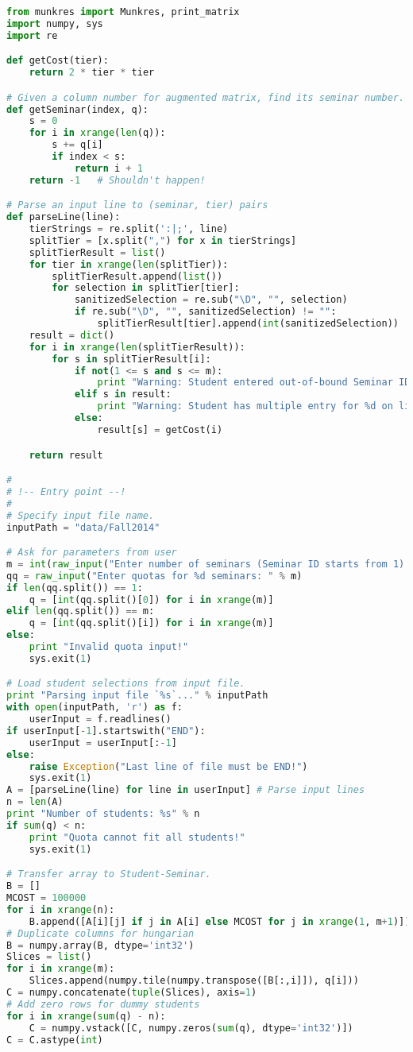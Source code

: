 \documentclass{article} %
\begin{document}
\begin{lstlisting}[language=python]
from munkres import Munkres, print_matrix
import numpy, sys
import re

def getCost(tier):
    return 2 * tier * tier

# Given a column number for augmented matrix, find its seminar number.
def getSeminar(index, q):
    s = 0
    for i in xrange(len(q)):
        s += q[i]
        if index < s:
            return i + 1
    return -1   # Shouldn't happen!

# Parse an input line to (seminar, tier) pairs
def parseLine(line):
    tierStrings = re.split(':|;', line)
    splitTier = [x.split(",") for x in tierStrings]
    splitTierResult = list()
    for tier in xrange(len(splitTier)):
        splitTierResult.append(list())
        for selection in splitTier[tier]:
            sanitizedSelection = re.sub("\D", "", selection)
            if re.sub("\D", "", sanitizedSelection) != "":
                splitTierResult[tier].append(int(sanitizedSelection))
    result = dict()
    for i in xrange(len(splitTierResult)):
        for s in splitTierResult[i]:
            if not(1 <= s and s <= m):
                print "Warning: Student entered out-of-bound Seminar ID: %s" % line
            elif s in result:
                print "Warning: Student has multiple entry for %d on line %s" % (s, line)
            else:
                result[s] = getCost(i)

    return result

#
# !-- Entry point --!
#
# Specify input file name. 
inputPath = "data/Fall2014"

# Ask for parameters from user
m = int(raw_input("Enter number of seminars (Seminar ID starts from 1): "))
qq = raw_input("Enter quotas for %d seminars: " % m)
if len(qq.split()) == 1:
    q = [int(qq.split()[0]) for i in xrange(m)]
elif len(qq.split()) == m:
    q = [int(qq.split()[i]) for i in xrange(m)]
else:
    print "Invalid quota input!"
    sys.exit(1)

# Load student selections from input file.
print "Parsing input file `%s`..." % inputPath
with open(inputPath, 'r') as f:
    userInput = f.readlines()
if userInput[-1].startswith("END"):
    userInput = userInput[:-1]
else:
    raise Exception("Last line of file must be END!")
    sys.exit(1)
A = [parseLine(line) for line in userInput] # Parse input lines
n = len(A)
print "Number of students: %s" % n
if sum(q) < n:
    print "Quota cannot fit all students!"
    sys.exit(1)

# Transfer array to Student-Seminar.
B = []
MCOST = 100000
for i in xrange(n):
    B.append([A[i][j] if j in A[i] else MCOST for j in xrange(1, m+1)])
# Duplicate columns for hungarian
B = numpy.array(B, dtype='int32')
Slices = list()
for i in xrange(m):
    Slices.append(numpy.tile(numpy.transpose([B[:,i]]), q[i]))
C = numpy.concatenate(tuple(Slices), axis=1)
# Add zero rows for dummy students
for i in xrange(sum(q) - n):
    C = numpy.vstack([C, numpy.zeros(sum(q), dtype='int32')])
C = C.astype(int)


\end{lstlisting}
\end{document}

